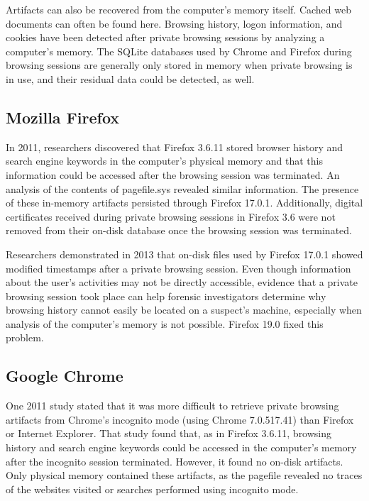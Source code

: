 \documentclass[pdftex,letterpaper,titlepage,12pt]{article}
\begin{document}
    Artifacts can also be recovered from the computer's memory itself. Cached
    web documents can often be found here.\cite{ohana13} Browsing history,
    logon information, and cookies have been detected after private browsing
    sessions by analyzing a computer's memory. The SQLite databases used by 
    Chrome and Firefox during browsing sessions are generally only stored in 
    memory when private browsing is in use, and their residual data could be 
    detected, as well.\cite{satvat13}

    \subsection{Mozilla Firefox}
    In 2011, researchers discovered that Firefox 3.6.11 stored browser history
    and search engine keywords in the computer's physical memory and that this
    information could be accessed after the browsing session was terminated.
    An analysis of the contents of pagefile.sys revealed similar information.
    \cite{said11} The presence of these in-memory artifacts persisted through 
    Firefox 17.0.1.\cite{ohana13} Additionally, digital certificates received 
    during private browsing sessions in Firefox 3.6 were not removed from their 
    on-disk database once the browsing session was terminated.\cite{aggarwal10}
    
    Researchers demonstrated in 2013 that on-disk files used by Firefox 17.0.1 
    showed modified timestamps after a private browsing session. Even though
    information about the user's activities may not be directly accessible,
    evidence that a private browsing session took place can help forensic
    investigators determine why browsing history cannot easily be located on a
    suspect's machine, especially when analysis of the computer's memory is not
    possible.\cite{ohana13} Firefox 19.0 fixed this problem.\cite{satvat13}

    \subsection{Google Chrome}
    One 2011 study stated that it was more difficult to retrieve private
    browsing artifacts from Chrome's incognito mode (using Chrome 7.0.517.41) 
    than Firefox or Internet Explorer. That study found that, as in Firefox 
    3.6.11, browsing history and search engine keywords could be accessed in 
    the computer's memory after the incognito session terminated. However, it 
    found no on-disk artifacts. Only physical memory contained these artifacts, 
    as the pagefile revealed no traces of the websites visited or searches 
    performed using incognito mode.\cite{said11}
    
\end{document}
